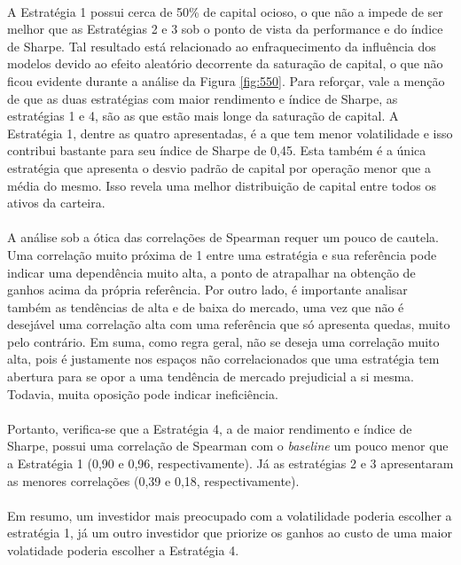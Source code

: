 \paragraph{} A Estratégia 1 possui cerca de 50\% de capital ocioso, o que não a impede de ser melhor que as Estratégias 2 e 3 sob o ponto de vista da performance e do índice de Sharpe. Tal resultado está relacionado ao enfraquecimento da influência dos modelos devido ao efeito aleatório decorrente da saturação de capital, o que não ficou evidente durante a análise da Figura \ref{fig:550}. Para reforçar, vale a menção de que as duas estratégias com maior rendimento e índice de Sharpe, as estratégias 1 e 4, são as que estão mais longe da saturação de capital. A Estratégia 1, dentre as quatro apresentadas, é a que tem menor volatilidade e isso contribui bastante para seu índice de Sharpe de 0,45. Esta também é a única estratégia que apresenta o desvio padrão de capital por operação menor que a média do mesmo. Isso revela uma melhor distribuição de capital entre todos os ativos da carteira.

\paragraph{} A análise sob a ótica das correlações de Spearman requer um pouco de cautela. Uma correlação muito próxima de 1 entre uma estratégia e sua referência pode indicar uma dependência muito alta, a ponto de atrapalhar na obtenção de ganhos acima da própria referência. Por outro lado, é importante analisar também as tendências de alta e de baixa do mercado, uma vez que não é desejável uma correlação alta com uma referência que só apresenta quedas, muito pelo contrário. Em suma, como regra geral, não se deseja uma correlação muito alta, pois é justamente nos espaços não correlacionados que uma estratégia tem abertura para se opor a uma tendência de mercado prejudicial a si mesma. Todavia, muita oposição pode indicar ineficiência.

\paragraph{} Portanto, verifica-se que a Estratégia 4, a de maior rendimento e índice de Sharpe, possui uma correlação de Spearman com o \textit{baseline} um pouco menor que a Estratégia 1 (0,90 e 0,96, respectivamente). Já as estratégias 2 e 3 apresentaram as menores correlações (0,39 e 0,18, respectivamente).

\paragraph{} Em resumo, um investidor mais preocupado com a volatilidade poderia escolher a estratégia 1, já um outro investidor que priorize os ganhos ao custo de uma maior volatidade poderia escolher a Estratégia 4.
